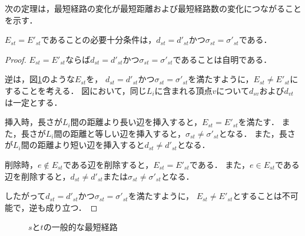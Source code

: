 次の定理は，最短経路の変化が最短距離および最短経路数の変化につながることを示す．
\begin{theorem}
  \label{thm:condition-of-invariability-of-shortest-path}
  $E_{st}=E'_{st}$であることの必要十分条件は，$d_{st}=d'_{st}$かつ$\sigma_{st}=\sigma'_{st}$である．
\end{theorem}
\begin{proof}
  $E_{st}=E'_{st}$ならば$d_{st}=d'_{st}$かつ$\sigma_{st}=\sigma'_{st}$であることは自明である．

  逆は，図\ref{fig:proof-invariability-of-paths}のような$E_{st}$を，
  $d_{st}=d'_{st}$かつ$\sigma_{st}=\sigma'_{st}$を満たすように，$E_{st}\neq E'_{st}$にすることを考える．
  図において，同じ$L_i$に含まれる頂点$v$について$d_{sv}$および$d_{vt}$は一定とする．

  挿入時，長さが$L_i$間の距離より長い辺を挿入すると，$E_{st}=E'_{st}$を満たす．
  また，長さが$L_i$間の距離と等しい辺を挿入すると，$\sigma_{st}\neq\sigma'_{st}$となる．
  また，長さが$L_i$間の距離より短い辺を挿入すると$d_{st}\neq d'_{st}$となる．

  削除時，$e\notin E_{st}$である辺を削除すると，$E_{st}=E'_{st}$である．
  また，$e\in E_{st}$である辺を削除すると，$d_{st}\neq d'_{st}$または$\sigma_{st}\neq\sigma'_{st}$となる．

  したがって$d_{st}=d'_{st}$かつ$\sigma_{st}=\sigma'_{st}$を満たすように，
  $E_{st}\neq E'_{st}$とすることは不可能で，逆も成り立つ．

\end{proof}
\begin{figure}
  \centering
  \def\svgwidth{.5\columnwidth}
  
  \caption{$s$と$t$の一般的な最短経路}
  \label{fig:proof-invariability-of-paths}
\end{figure}

